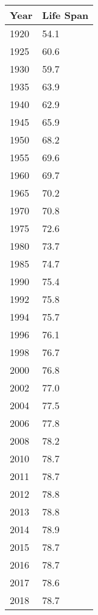 \begin{minipage}[t]{0.12\textwidth}
    \par\begin{center}\begin{tabular}{m{1cm}|m{1cm}}
    Year & Life Span \\\hline
    1920 & 54.1 \\
        1925 & 60.6 \\
    1930 & 59.7 \\
        1935 & 63.9 \\
    1940 & 62.9 \\
        1945 & 65.9 \\
    1950 & 68.2 \\
    1955 & 69.6 \\
    1960 & 69.7 \\
    1965 & 70.2 \\
    1970 & 70.8 \\
    1975 & 72.6 \\
    1980 & 73.7 \\
    1985 & 74.7 \\
    1990 & 75.4 \\
    1992 & 75.8 \\
    1994 & 75.7 \\
    1996 & 76.1 \\
    1998 & 76.7 \\
    2000 & 76.8 \\
    2002 & 77.0 \\
    2004 & 77.5 \\
    2006 & 77.8 \\
    2008 & 78.2 \\
    2010 & 78.7 \\
    2011 & 78.7 \\
    2012 & 78.8 \\
    2013 & 78.8 \\
    2014 & 78.9 \\
    2015 & 78.7 \\
    2016 & 78.7 \\
    2017 & 78.6 \\
    2018 & 78.7
\end{tabular}\end{center}
\end{minipage}



